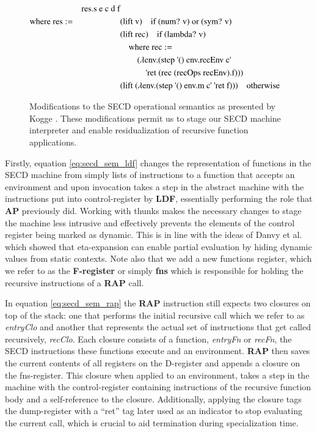 \documentclass[a4paper,12pt,twoside,openright]{report}
\theoremstyle{definition}
\newcommand{\ts}{\textquotesingle}
\begin{document}
\begin{figure}[ht!]
\begin{alignat}{5}
		 && \text{res.s e c d f}   \\
		 \text{where res} & := && \text{(lift v)\quad if (num? v) or (sym? v)} \nonumber \\
		 & && \text{(lift rec)} \quad \text{if (lambda? v)} \nonumber \\
		 & && \quad \text{where rec} := \nonumber \\ 
		 & && \qquad\text{($\lambda$env.(step {\ts}() env.recEnv c{\ts}} \nonumber \\
		 & && \qquad\quad \text{{\ts}ret (rec (recOps recEnv).f)))} \nonumber \\
		 & && \text{(lift ($\lambda$env.(step {\ts}() env.m c{\ts} {\ts}ret f)))} \quad\text{otherwise} \nonumber
\end{alignat}
\caption{Modifications to the SECD operational semantics as presented by Kogge \cite{kogge1990architecture}. These modifications permit us to stage our SECD machine interpreter and enable residualization of recursive function applications.}
\label{fig:secd_semantics_noset}
\end{figure}
\endgroup

Firstly, equation \ref{eq:secd_sem_ldf} changes the representation of functions in the SECD machine from simply lists of instructions to a function that accepts an environment and upon invocation takes a step in the abstract machine with the instructions put into control-register by \textbf{LDF}, essentially performing the role that \textbf{AP} previously did. Working with thunks makes the necessary changes to stage the machine less intrusive and effectively prevents the elements of the control register being marked as dynamic. This is in line with the ideas of Danvy et al. \cite{danvy1995essence} which showed that eta-expansion can enable partial evaluation by hiding dynamic values from static contexts. Note also that we add a new functions register, which we refer to as the \textbf{F-register} or simply \textbf{fns} which is responsible for holding the recursive instructions of a \textbf{RAP} call.

In equation \ref{eq:secd_sem_rap} the \textbf{RAP} instruction still expects two closures on top of the stack: one that performs the initial recursive call which we refer to as \textit{entryClo} and another that represents the actual set of instructions that get called recursively, \textit{recClo}. Each closure consists of a function, \textit{entryFn} or \textit{recFn}, the SECD instructions these functions execute and an environment. \textbf{RAP} then saves the current contents of all registers on the D-register and appends a closure on the fns-register. This closure when applied to an environment, takes a step in the machine with the control-register containing instructions of the recursive function body and a self-reference to the closure. Additionally, applying the closure tags the dump-register with a ``ret'' tag later used as an indicator to stop evaluating the current call, which is crucial to aid termination during specialization time.
\end{document}
